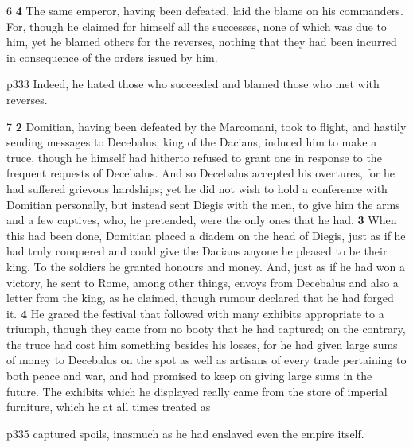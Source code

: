 6 \textbf{4} The same emperor, having been defeated, laid the blame on his commanders. For, though he claimed for himself all the successes, none of which was due to him, yet he blamed others for the reverses, nothing that they had been incurred in consequence of the orders issued by him.

p333 Indeed, he hated those who succeeded and blamed those who met with reverses.

7 \textbf{2} Domitian, having been defeated by the Marcomani, took to flight, and hastily sending messages to Decebalus, king of the Dacians, induced him to make a truce, though he himself had hitherto refused to grant one in response to the frequent requests of Decebalus. And so Decebalus accepted his overtures, for he had suffered grievous hardships; yet he did not wish to hold a conference with Domitian personally, but instead sent Diegis with the men, to give him the arms and a few captives, who, he pretended, were the only ones that he had. \textbf{3} When this had been done, Domitian placed a diadem on the head of Diegis, just as if he had truly conquered and could give the Dacians anyone he pleased to be their king. To the soldiers he granted honours and money. And, just as if he had won a victory, he sent to Rome, among other things, envoys from Decebalus and also a letter from the king, as he claimed, though rumour declared that he had forged it. \textbf{4} He graced the festival that followed with many exhibits appropriate to a triumph, though they came from no booty that he had captured; on the contrary, the truce had cost him something besides his losses, for he had given large sums of money to Decebalus on the spot as well as artisans of every trade pertaining to both peace and war, and had promised to keep on giving large sums in the future. The exhibits which he displayed really came from the store of imperial furniture, which he at all times treated as

p335 captured spoils, inasmuch as he had enslaved even the empire itself.

